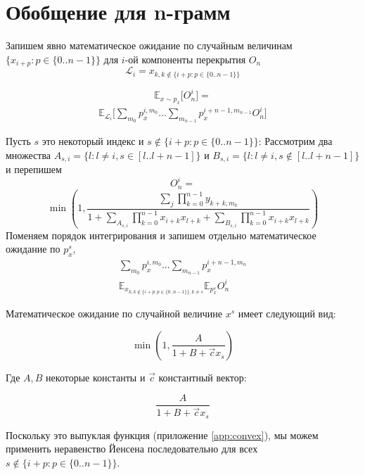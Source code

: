 \documentclass[14pt, a4paper]{extarticle}
\begin{document}
\section{Обобщение для n-грамм}
\label{app:n-grams}
Запишем явно математическое ожидание по случайным величинам $\{x_{i + p}: p \in \{0..n-1\}\}$ для $i$-ой компоненты перекрытия $O_n$
$$
\mathscr{L}_i = {x_{k,k \not\in \{i + p: p \in \{0..n-1\} \} }}
$$

$$
\mathbb{E}_{x\sim p_x} \big[ O_n^i \big] =
$$
\begin{equation}
\begin{split}
\mathbb{E}_{\mathscr{L}_i}
 \Big \lbrack
\sum_{m_0} p_x^{i,m_0} ... \sum_{m_{n-1}} p_x^{i+n-1,m_{n-1}}  O_n^i
 \Big \rbrack
\label{bleu_i_2}
\end{split}
\end{equation}

Пусть $s$ это некоторый индекс и  $s \not\in \{i + p: p \in \{0..n-1\} \}$:
Рассмотрим два множества $A_{s, i} = \{l: l \ne i, s \in [l..l+n-1]\}$ и
 $B_{s, i}=\{l: l \ne i, s \not\in [l..l+n-1] \}$
и перепишем
$$O_n^i = $$
$$
\min(1, \frac{\sum_j \prod\limits_{k=0}^{n-1}y_{k + k, m_k}}
                               {1 + \sum\limits_{A_{s, i}} \prod\limits_{k=0}^{n-1} x_{i + k}x_{l + k}
                                  + \sum\limits_{B_{s, i}} \prod\limits_{k=0}^{n-1} x_{i + k}x_{l + k}})$$
Поменяем порядок интегрирования и запишем отдельно математическое ожидание по $p_x^s$,
\begin{equation}
\begin{split}
\sum_{m_0} p_x^{i,m_0} ... \sum_{m_{n-1}} p_x^{i+n-1,m_n} \\
\mathbb{E}_{x_{k,k \not\in \{i + p: p \in \{0..n-1\} \}, k \ne s} } \mathbb{E}_{p_x^s} O_n^i
\label{bleu_i_3}
\end{split}
\end{equation}


Математическое ожидание по случайной величине $x^s$ имеет следующий вид:

$$ \min(1, \frac{A}{1 + B + \vec{c} x_s})$$

Где $A, B$ некоторые константы и $\vec{c}$ константный вектор:

$$\frac{A}{1 + B + \vec{c} x_s}$$

Поскольку это выпуклая функция (приложение \ref{app:convex}), мы можем применить неравенство Йенсена последовательно для всех $s \not\in \{i + p: p \in \{0..n-1\} \}$.
\end{document}

